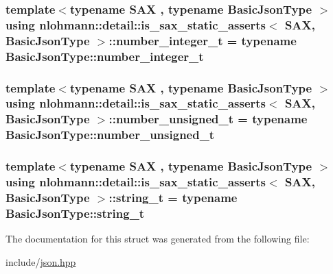 \subsubsection[{\texorpdfstring{number\+\_\+integer\+\_\+t}{number_integer_t}}]{\setlength{\rightskip}{0pt plus 5cm}template$<$typename S\+AX , typename Basic\+Json\+Type $>$ using {\bf nlohmann\+::detail\+::is\+\_\+sax\+\_\+static\+\_\+asserts}$<$ S\+AX, Basic\+Json\+Type $>$\+::{\bf number\+\_\+integer\+\_\+t} =  typename Basic\+Json\+Type\+::number\+\_\+integer\+\_\+t\hspace{0.3cm}{\ttfamily [private]}}\hypertarget{structnlohmann_1_1detail_1_1is__sax__static__asserts_a474adf99bf1eaa8292284fd3064c80fe}{}\label{structnlohmann_1_1detail_1_1is__sax__static__asserts_a474adf99bf1eaa8292284fd3064c80fe}
\subsubsection[{\texorpdfstring{number\+\_\+unsigned\+\_\+t}{number_unsigned_t}}]{\setlength{\rightskip}{0pt plus 5cm}template$<$typename S\+AX , typename Basic\+Json\+Type $>$ using {\bf nlohmann\+::detail\+::is\+\_\+sax\+\_\+static\+\_\+asserts}$<$ S\+AX, Basic\+Json\+Type $>$\+::{\bf number\+\_\+unsigned\+\_\+t} =  typename Basic\+Json\+Type\+::number\+\_\+unsigned\+\_\+t\hspace{0.3cm}{\ttfamily [private]}}\hypertarget{structnlohmann_1_1detail_1_1is__sax__static__asserts_af8733df7fcaebb25434285885db7f127}{}\label{structnlohmann_1_1detail_1_1is__sax__static__asserts_af8733df7fcaebb25434285885db7f127}
\subsubsection[{\texorpdfstring{string\+\_\+t}{string_t}}]{\setlength{\rightskip}{0pt plus 5cm}template$<$typename S\+AX , typename Basic\+Json\+Type $>$ using {\bf nlohmann\+::detail\+::is\+\_\+sax\+\_\+static\+\_\+asserts}$<$ S\+AX, Basic\+Json\+Type $>$\+::{\bf string\+\_\+t} =  typename Basic\+Json\+Type\+::string\+\_\+t\hspace{0.3cm}{\ttfamily [private]}}\hypertarget{structnlohmann_1_1detail_1_1is__sax__static__asserts_a067c98d2145bb54d862f4794ac1287bb}{}\label{structnlohmann_1_1detail_1_1is__sax__static__asserts_a067c98d2145bb54d862f4794ac1287bb}


The documentation for this struct was generated from the following file\+:\begin{DoxyCompactItemize}
\item 
include/\hyperlink{json_8hpp}{json.\+hpp}\end{DoxyCompactItemize}
